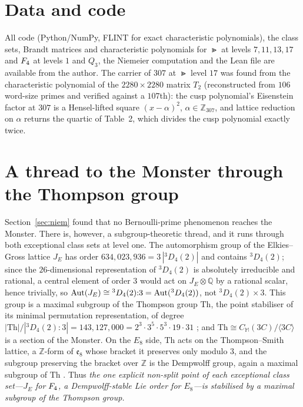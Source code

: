 \documentclass[11pt]{amsart}
\theoremstyle{definition}
\newcommand{\Z}{\mathbb{Z}}\newcommand{\Q}{\mathbb{Q}}\newcommand{\R}{\mathbb{R}}\newcommand{\A}{\mathbb{A}}\newcommand{\F}{\mathbb{F}}
\begin{document}
\section{Data and code}\label{app:data}
All code (Python/NumPy, FLINT for exact characteristic polynomials), the class sets, Brandt matrices and characteristic polynomials for $\Gt$ at levels $7,11,13,17$ and $F_4$ at levels $1$ and $Q_3$, the Niemeier computation and the Lean file are available from the author. The carrier of $307$ at $\Gt$ level $17$ was found from the characteristic polynomial of the $2280\times2280$ matrix $T_2$ (reconstructed from $106$ word-size primes and verified against a $107$th): the cusp polynomial's Eisenstein factor at $307$ is a Hensel-lifted square $(x-\alpha)^2$, $\alpha\in\Z_{307}$, and lattice reduction on $\alpha$ returns the quartic of Table~2, which divides the cusp polynomial exactly twice.

\section{A thread to the Monster through the Thompson group}\label{app:monster}
Section~\ref{sec:niem} found that no Bernoulli-prime phenomenon reaches the Monster. There is, however, a subgroup-theoretic thread, and it runs through both exceptional class sets at level one. The automorphism group of the Elkies--Gross lattice $J_E$ has order $634{,}023{,}936=3\,|{}^3D_4(2)|$ and contains ${}^3D_4(2)$; since the $26$-dimensional representation of ${}^3D_4(2)$ is absolutely irreducible and rational, a central element of order $3$ would act on $J_E\otimes\Q$ by a rational scalar, hence trivially, so $\operatorname{Aut}(J_E)\cong{}^3D_4(2){:}3=\operatorname{Aut}({}^3D_4(2))$, not ${}^3D_4(2)\times3$. This group is a maximal subgroup of the Thompson group $\mathrm{Th}$, the point stabiliser of its minimal permutation representation, of degree $|\mathrm{Th}|/|{}^3D_4(2){:}3|=143{,}127{,}000=2^3\cdot3^5\cdot5^3\cdot19\cdot31$ \cite{ATLAS}; and $\mathrm{Th}\cong C_{\mathbb M}(3C)/\langle3C\rangle$ is a section of the Monster. On the $E_8$ side, $\mathrm{Th}$ acts on the Thompson--Smith lattice, a $\Z$-form of $\mathfrak e_8$ whose bracket it preserves only modulo $3$, and the subgroup preserving the bracket over $\Z$ is the Dempwolff group, again a maximal subgroup of $\mathrm{Th}$ \cite{Th76}. Thus \emph{the one explicit non-split point of each exceptional class set---$J_E$ for $F_4$, a Dempwolff-stable Lie order for $E_8$---is stabilised by a maximal subgroup of the Thompson group.}
\end{document}
